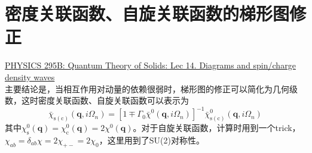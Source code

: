 \documentclass[10pt,openany]{book}
\theoremstyle{thmstyle} %
\theoremstyle{defstyle} %
\theoremstyle{prostyle} %
\begin{document}
\section{密度关联函数、自旋关联函数的梯形图修正}
\href{https://www.youtube.com/watch?v=jsThAjBPp8s&list=PLcD25rnTeV9geERxK7Tky8XsUghzeArEF&index=14&ab_channel=SubirSachdev}{PHYSICS 295B: Quantum Theory of Solids: Lec 14. Diagrams and spin/charge density waves}\\
主要结论是，当相互作用对动量的依赖很弱时，梯形图的修正可以简化为几何级数，这时密度关联函数、自旋关联函数可以表示为
\begin{equation}
  \bar{\chi}_{\mathrm{s}(\mathrm{c})}\left(\boldsymbol{q}, i \Omega_n\right)=\left[1 \mp \Gamma_0 \bar{\chi}^0\left(\boldsymbol{q}, i \Omega_n\right)\right]^{-1} \bar{\chi}_{\mathrm{s}(\mathrm{c})}^0\left(\boldsymbol{q}, i \Omega_n\right)
\end{equation}
其中$ \chi_{\mathrm{s}}^0(\boldsymbol{q})=\chi_{\mathrm{c}}^0(\boldsymbol{q})=2 \chi^0(\boldsymbol{q}) $。对于自旋关联函数，计算时用到一个trick，$ \chi_{ab} = \delta_{ab}\chi = 2\chi_{+-}= 2\chi_0 $，这里用到了SU(2)对称性。  
\end{document}
